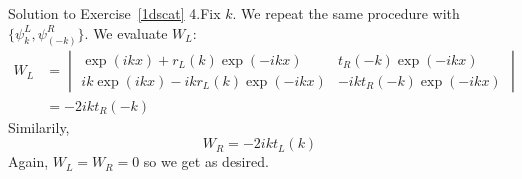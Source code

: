 \begin{mystsolution}{Solution to Exercise~\ref{1dscat}}
4.Fix $k$. We repeat the same procedure with $\{\psi_k^L,\psi_{( -k)}^R\}$. We evaluate $W_L$:
\begin{equation}
\begin{aligned}
W_L &= \begin{vmatrix}
\exp(ikx)+r_L(k)\exp(-ikx) & t_R(-k)\exp(-ikx) \\
ik\exp(ikx)-ikr_L(k)\exp(-ikx) & -ikt_R(-k)\exp(-ikx)
\end{vmatrix} \\
&= -2ikt_R(-k)
\end{aligned}
\end{equation}
Similarily,
\begin{equation}
W_R = -2ikt_L(k)
\end{equation}
Again, $W_L=W_R=0$ so we get as desired.

\end{mystsolution}